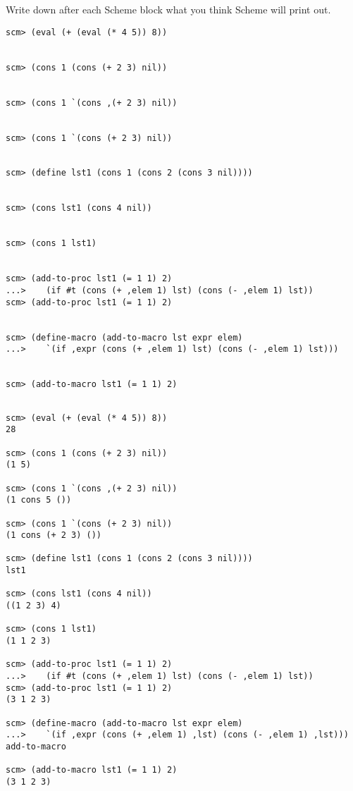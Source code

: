 \begin{blocksection}
\question Write down after each Scheme block what you think Scheme will print out.
\begin{lstlisting}
scm> (eval (+ (eval (* 4 5)) 8))


scm> (cons 1 (cons (+ 2 3) nil))


scm> (cons 1 `(cons ,(+ 2 3) nil))


scm> (cons 1 `(cons (+ 2 3) nil))


scm> (define lst1 (cons 1 (cons 2 (cons 3 nil))))


scm> (cons lst1 (cons 4 nil))


scm> (cons 1 lst1)


scm> (add-to-proc lst1 (= 1 1) 2)
...>    (if #t (cons (+ ,elem 1) lst) (cons (- ,elem 1) lst))
scm> (add-to-proc lst1 (= 1 1) 2)


scm> (define-macro (add-to-macro lst expr elem)
...>    `(if ,expr (cons (+ ,elem 1) lst) (cons (- ,elem 1) lst)))


scm> (add-to-macro lst1 (= 1 1) 2)


\end{lstlisting}
\begin{solution}
\begin{lstlisting}
scm> (eval (+ (eval (* 4 5)) 8))
28

scm> (cons 1 (cons (+ 2 3) nil))
(1 5)

scm> (cons 1 `(cons ,(+ 2 3) nil))
(1 cons 5 ())

scm> (cons 1 `(cons (+ 2 3) nil))
(1 cons (+ 2 3) ())

scm> (define lst1 (cons 1 (cons 2 (cons 3 nil))))
lst1

scm> (cons lst1 (cons 4 nil))
((1 2 3) 4)

scm> (cons 1 lst1)
(1 1 2 3)

scm> (add-to-proc lst1 (= 1 1) 2)
...>    (if #t (cons (+ ,elem 1) lst) (cons (- ,elem 1) lst))
scm> (add-to-proc lst1 (= 1 1) 2)
(3 1 2 3)

scm> (define-macro (add-to-macro lst expr elem)
...>    `(if ,expr (cons (+ ,elem 1) ,lst) (cons (- ,elem 1) ,lst)))
add-to-macro

scm> (add-to-macro lst1 (= 1 1) 2)
(3 1 2 3)
\end{lstlisting}
\end{solution}
\end{blocksection}
